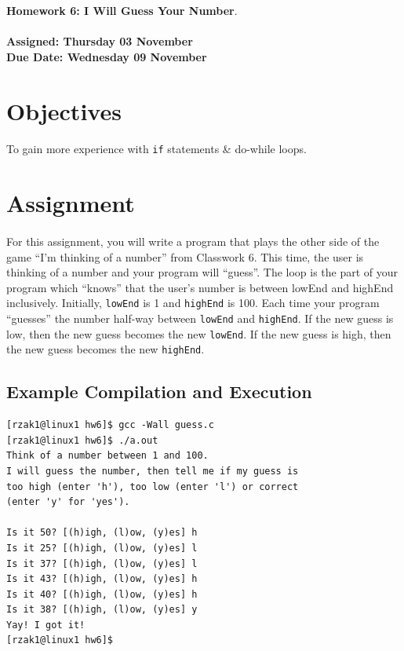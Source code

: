 \documentclass[letter,11pt]{article}
\begin{document}
\huge
\textbf{Homework 6: I Will Guess Your Number}.
\normalsize
\\ ~~ \\
\textbf{Assigned: Thursday 03 November} \\
\textbf{Due Date: Wednesday 09 November}

\section*{Objectives}
\paragraph{}To gain more experience with \texttt{if} statements \& do-while loops.

\FloatBarrier
\section*{Assignment}
\paragraph{}For this assignment, you will write a program that plays the other side of the game ``I'm thinking of a number'' from Classwork 6. This time, the user is thinking of a number and your program will ``guess''. The loop is the part of your program which ``knows'' that the user's number is between lowEnd and highEnd inclusively. Initially, \texttt{lowEnd} is 1 and \texttt{highEnd} is 100. Each time your program ``guesses'' the number half-way between \texttt{lowEnd} and \texttt{highEnd}. If the new guess is low, then the new guess becomes the new \texttt{lowEnd}. If the new guess is high, then the new guess becomes the new \texttt{highEnd}.

\subsection*{Example Compilation and Execution}
\begin{verbatim}
[rzak1@linux1 hw6]$ gcc -Wall guess.c
[rzak1@linux1 hw6]$ ./a.out
Think of a number between 1 and 100.
I will guess the number, then tell me if my guess is
too high (enter 'h'), too low (enter 'l') or correct
(enter 'y' for 'yes').

Is it 50? [(h)igh, (l)ow, (y)es] h
Is it 25? [(h)igh, (l)ow, (y)es] l
Is it 37? [(h)igh, (l)ow, (y)es] l
Is it 43? [(h)igh, (l)ow, (y)es] h
Is it 40? [(h)igh, (l)ow, (y)es] h
Is it 38? [(h)igh, (l)ow, (y)es] y
Yay! I got it!
[rzak1@linux1 hw6]$ 
\end{verbatim}
\end{document}
